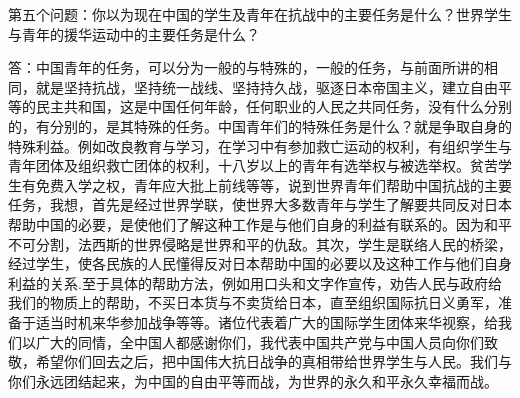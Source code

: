 第五个问题：你以为现在中国的学生及青年在抗战中的主要任务是什么？世界学生与青年的援华运动中的主要任务是什么？

答：中国青年的任务，可以分为一般的与特殊的，一般的任务，与前面所讲的相同，就是坚持抗战，坚持统一战线、坚持持久战，驱逐日本帝国主义，建立自由平等的民主共和国，这是中国任何年龄，任何职业的人民之共同任务，没有什么分别的，有分别的，是其特殊的任务。中国青年们的特殊任务是什么？就是争取自身的特殊利益。例如改良教育与学习，在学习中有参加救亡运动的权利，有组织学生与青年团体及组织救亡团体的权利，十八岁以上的青年有选举权与被选举权。贫苦学生有免费入学之权，青年应大批上前线等等，说到世界青年们帮助中国抗战的主要任务，我想，首先是经过世界学联，使世界大多数青年与学生了解要共同反对日本帮助中国的必要，是使他们了解这种工作是与他们自身的利益有联系的。因为和平不可分割，法西斯的世界侵略是世界和平的仇敌。其次，学生是联络人民的桥梁，经过学生，使各民族的人民懂得反对日本帮助中国的必要以及这种工作与他们自身利益的关系.至于具体的帮助方法，例如用口头和文字作宣传，劝告人民与政府给我们的物质上的帮助，不买日本货与不卖货给日本，直至组织国际抗日义勇军，准备于适当时机来华参加战争等等。诸位代表着广大的国际学生团体来华视察，给我们以广大的同情，全中国人都感谢你们，我代表中国共产党与中国人员向你们致敬，希望你们回去之后，把中国伟大抗日战争的真相带给世界学生与人民。我们与你们永远团结起来，为中国的自由平等而战，为世界的永久和平永久幸福而战。

